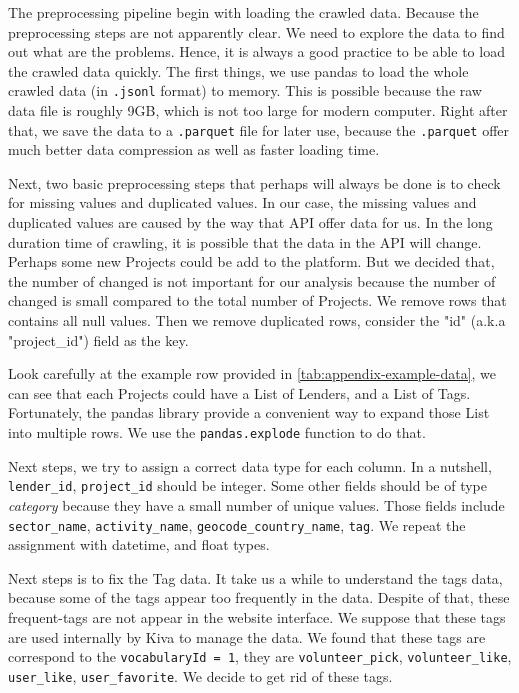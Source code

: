 The preprocessing pipeline begin with loading the crawled data.
Because the preprocessing steps are not apparently clear.
We need to explore the data to find out what are the problems.
Hence, it is always a good practice to be able to load the crawled data quickly.
The first things, we use pandas to load the whole crawled data (in \lstinline|.jsonl| format) to memory.
This is possible because the raw data file is roughly 9GB, which is not too large for modern computer.
Right after that, we save the data to a \lstinline|.parquet| file for later use,
because the \lstinline|.parquet| offer much better data compression as well as faster loading time.

Next, two basic preprocessing steps that perhaps will always be done is to check for missing values and duplicated values.
In our case, the missing values and duplicated values are caused by the way that API offer data for us.
In the long duration time of crawling, it is possible that the data in the API will change.
Perhaps some new Projects could be add to the platform.
But we decided that, the number of changed is not important for our analysis because the number of changed is small compared to the total number of Projects.
We remove rows that contains all null values.
Then we remove duplicated rows, consider the "id" (a.k.a "project\_id") field as the key.

Look carefully at the example row provided in \ref{tab:appendix-example-data},
we can see that each Projects could have a List of Lenders, and a List of Tags.
Fortunately, the pandas library provide a convenient way to expand those List into multiple rows.
We use the \lstinline|pandas.explode| function to do that.

Next steps, we try to assign a correct data type for each column.
In a nutshell, \lstinline|lender_id|, \lstinline|project_id| should be integer.
Some other fields should be of type \textit{category} because they have a small number of unique values.
Those fields include \lstinline|sector_name|, \lstinline|activity_name|, \lstinline|geocode_country_name|, \lstinline|tag|.
We repeat the assignment with datetime, and float types.

Next steps is to fix the Tag data.
It take us a while to understand the tags data, because some of the tags appear too frequently in the data.
Despite of that, these frequent-tags are not appear in the website interface.
We suppose that these tags are used internally by Kiva to manage the data.
We found that these tags are correspond to the \lstinline|vocabularyId = 1|,
they are \lstinline|volunteer_pick|, \lstinline|volunteer_like|, \lstinline|user_like|, \lstinline|user_favorite|.
We decide to get rid of these tags.

